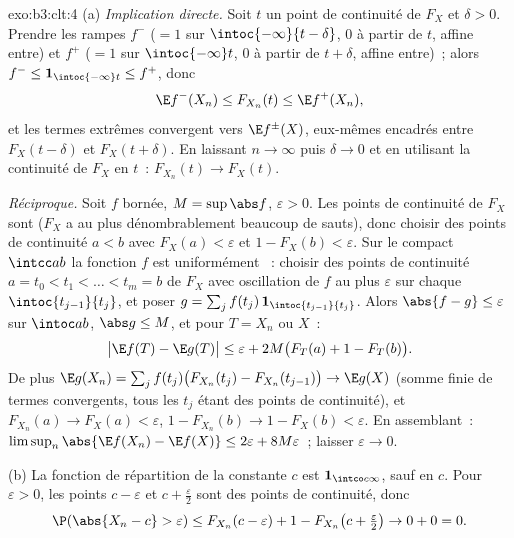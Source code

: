 \begin{solution}{exo:b3:clt:4}
(a) \emph{Implication directe.} Soit $t$ un point de continuité
de $F_X$ et $\delta > 0$. Prendre les rampes  $f^-$
($= 1$ sur $\intoc{-\infty}{t-\delta}$, $0$ à partir de $t$,
affine entre) et $f^+$ ($= 1$ sur $\intoc{-\infty}t$, $0$ à
partir de $t + \delta$, affine entre)~; alors $f^- \leq
\mathbf 1_{\intoc{-\infty}t} \leq f^+$, donc
\[
\E f^-(X_n) \leq F_{X_n}(t) \leq \E f^+(X_n),
\]
et les termes extrêmes convergent vers $\E f^\pm(X)$,
eux-mêmes encadrés entre $F_X(t - \delta)$ et $F_X(t +
\delta)$. En laissant $n \to \infty$ puis $\delta \to 0$ et en
utilisant la continuité de $F_X$ en $t$~: $F_{X_n}(t) \to
F_X(t)$.

\emph{Réciproque.} Soit $f$  bornée, $M =
\sup\abs f$, $\varepsilon > 0$. Les points de continuité de
$F_X$ sont  ($F_X$ a au plus dénombrablement beaucoup
de sauts), donc choisir des points de continuité $a < b$ avec
$F_X(a) < \varepsilon$ et $1 - F_X(b) < \varepsilon$. Sur le
compact $\intcc ab$ la fonction $f$ est uniformément ~:
choisir des points de continuité $a = t_0 < t_1 < \dots < t_m
= b$ de $F_X$ avec oscillation de $f$ au plus $\varepsilon$
sur chaque $\intoc{t_{j-1}}{t_j}$, et poser $g = \sum_j
f(t_j)\,\mathbf 1_{\intoc{t_{j-1}}{t_j}}$. Alors $\abs{f - g}
\leq \varepsilon$ sur $\intoc ab$, $\abs g \leq M$, et pour
$T = X_n$ ou $X$~:
\[
\bigl|\E f(T) - \E g(T)\bigr| \leq \varepsilon +
2M\bigl(F_T(a) + 1 - F_T(b)\bigr).
\]
De plus $\E g(X_n) = \sum_j f(t_j)\bigl(F_{X_n}(t_j) -
F_{X_n}(t_{j-1})\bigr) \to \E g(X)$ (somme finie de termes
convergents, tous les $t_j$ étant des points de continuité),
et $F_{X_n}(a) \to F_X(a) < \varepsilon$, $1 - F_{X_n}(b) \to
1 - F_X(b) < \varepsilon$. En assemblant~:
$\limsup_n\abs{\E f(X_n) - \E f(X)} \leq 2\varepsilon +
8M\varepsilon$~; laisser $\varepsilon \to 0$.

(b) La fonction de répartition de la constante $c$ est
$\mathbf 1_{\intco c\infty}$,  sauf en $c$. Pour
$\varepsilon > 0$, les points $c - \varepsilon$ et $c +
\frac\varepsilon2$ sont des points de continuité, donc
\[
\P(\abs{X_n - c} > \varepsilon) \leq F_{X_n}(c -
\varepsilon) + 1 - F_{X_n}\bigl(c +
\tfrac\varepsilon2\bigr) \to 0 + 0 = 0.
\]
\end{solution}

